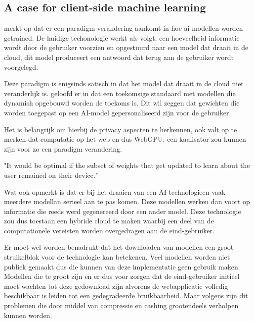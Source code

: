 \subsection{A case for client-side machine learning} %

\textcite{Fleetwood2022} merkt op dat er een paradigm verandering aankomt in hoe ai-modellen worden getrained. De huidige techonologie werkt als volgt; een hoeveelheid informatie wordt door de gebruiker voorzien en opgestuurd naar een model dat draait in de cloud, dit model produceert een antwoord dat terug aan de gebruiker wordt voorgelegd.

\bigbreak{}

Deze paradigm is enigsinds satisch in dat het model dat draait in de cloud niet veranderlijk is. \textcite{Fleetwood2022} geloofd er in dat een toekomsige standaard met modellen die dynamish opgebouwd worden de toekoms is. Dit wil zeggen dat gewichten die worden toegepast op een AI-model gepersonaliseerd zijn voor de gebruiker.

\bigbreak{}

Het is belangrijk om hierbij de privacy aspecten te herkennen, ook valt op te merken dat computatie op het web en dus WebGPU; een kaalisator zou kunnen zijn voor zo een paradigm verandering.

\begin{displayquote}
    "It would be optimal if the subset of weights that get updated to learn about the user remained on their device." \autocite{Fleetwood2022}
\end{displayquote}

Wat \textcite{Fleetwood2022} ook opmerkt is dat er bij het draaien van een AI-technologieen vaak meerdere modellan serieel aan te pas komen. Deze modellen werken dan voort op informatie die reeds werd gegenereerd door een ander model. Deze technologie zou dus toestaan een hybride cloud te maken waarbij een deel van de computationele vereisten worden overgedragen aan de eind-gebruiker.

\bigbreak{}

Er moet wel worden benadrukt dat het downloaden van modellen een groot struikelblok voor de technologie kan betekenen. Veel modellen worden niet publiek gemaakt dus die kunnen van deze implementatie geen gebruik maken. Modellen die te groot zijn en er dus voor zorgen dat de eind-gebruiker initieel moet wachten tot deze gedownload zijn alvorens de webapplicatie volledig beschikbaar is leiden tot een gedegradeerde bruikbaarheid. Maar volgens \textcite{Fleetwood2022} zijn dit problemen die door middel van compressie en cashing grootendeels verholpen kunnen worden.